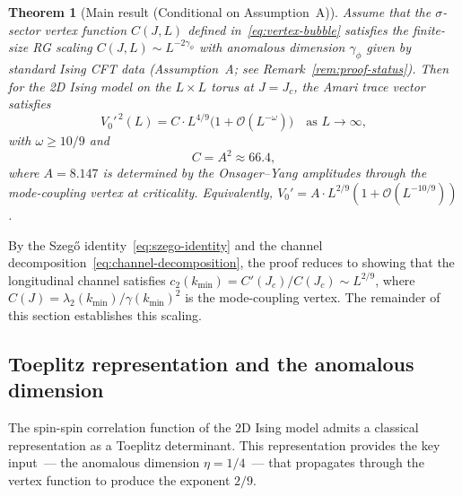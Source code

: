\documentclass[11pt]{article}
\newtheorem{theorem}{Theorem}[section]
\theoremstyle{definition}
\theoremstyle{remark}
\newcommand{\Jc}{J_c}
\newcommand{\cO}{\mathcal{O}}
\begin{document}
\begin{theorem}[Main result (Conditional on Assumption~A)]
\label{thm:main}
Assume that the $\sigma$-sector vertex function $C(J,L)$ defined
in~\eqref{eq:vertex-bubble} satisfies the finite-size RG scaling
$C(J,L) \sim L^{-2\gamma_\phi}$ with anomalous dimension
$\gamma_\phi$ given by standard Ising CFT data
\textnormal{(Assumption~A; see Remark~\ref{rem:proof-status})}.
Then for the 2D Ising model on the $L \times L$ torus at $J = \Jc$,
the Amari trace vector satisfies
\begin{equation}
  V_0'^{\,2}(L) = C \cdot L^{4/9}\bigl(1 + \cO(L^{-\omega})\bigr)
  \quad \text{as } L \to \infty,
  \label{eq:main-theorem}
\end{equation}
with $\omega \geq 10/9$ and
\begin{equation}
  C = A^2 \approx 66.4,
  \label{eq:prefactor}
\end{equation}
where $A = 8.147$ is determined by the Onsager--Yang amplitudes
through the mode-coupling vertex at criticality.
Equivalently, $V_0' = A \cdot L^{2/9}(1 + \cO(L^{-10/9}))$.
\end{theorem}

By the Szeg\H{o} identity~\eqref{eq:szego-identity} and the
channel decomposition~\eqref{eq:channel-decomposition}, the proof
reduces to showing that the longitudinal channel satisfies
$c_2(k_{\min}) = C'(\Jc)/C(\Jc) \sim L^{2/9}$, where
$C(J) = \lambda_2(k_{\min})/\gamma(k_{\min})^2$ is the mode-coupling
vertex. The remainder of this section establishes this scaling.


\subsection{Toeplitz representation and the anomalous dimension}
\label{subsec:toeplitz-fh}

The spin-spin correlation function of the 2D Ising model admits a
classical representation as a Toeplitz determinant. This representation
provides the key input~--- the anomalous dimension $\eta = 1/4$~--- that
propagates through the vertex function to produce the exponent $2/9$.
\end{document}
